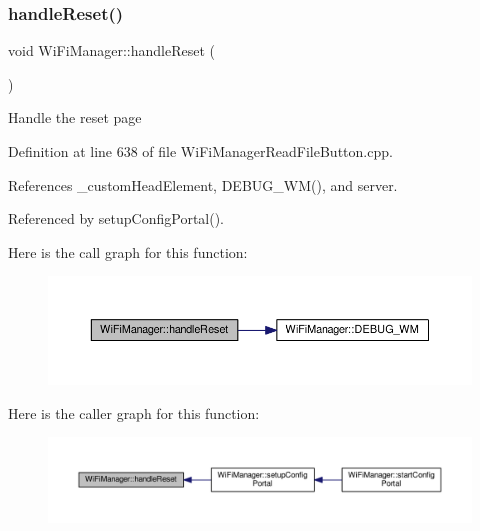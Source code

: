 \subsubsection{\texorpdfstring{handle\+Reset()}{handleReset()}}
{\footnotesize\ttfamily void Wi\+Fi\+Manager\+::handle\+Reset (\begin{DoxyParamCaption}{ }\end{DoxyParamCaption})\hspace{0.3cm}{\ttfamily [private]}}

Handle the reset page 

Definition at line 638 of file Wi\+Fi\+Manager\+Read\+File\+Button.\+cpp.



References \+\_\+custom\+Head\+Element, D\+E\+B\+U\+G\+\_\+\+W\+M(), and server.



Referenced by setup\+Config\+Portal().

Here is the call graph for this function\+:\nopagebreak
\begin{figure}[H]
\begin{center}
\leavevmode
\includegraphics[width=350pt]{d4/dc8/class_wi_fi_manager_a94fb1a8fcfbd0d02714c69138bf72f9c_cgraph}
\end{center}
\end{figure}
Here is the caller graph for this function\+:\nopagebreak
\begin{figure}[H]
\begin{center}
\leavevmode
\includegraphics[width=350pt]{d4/dc8/class_wi_fi_manager_a94fb1a8fcfbd0d02714c69138bf72f9c_icgraph}
\end{center}
\end{figure}
\mbox{\label{class_wi_fi_manager_a7d01f7de3e4b76acdabffac79fa3d0ab}} 

